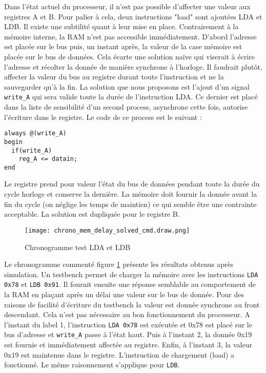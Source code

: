 Dans l'état actuel du processeur, il n'est pas possible d'affecter une valeur aux registres A et B.
Pour palier à cela, deux instructions "load" sont ajoutées LDA et LDB.
Il existe une subtilité quant à leur mise en place. Contrairement à la mémoire interne, la RAM n'est pas accessible immédiatement. 
D'abord l'adresse est placée sur le bus puis, un instant après, la valeur de la case mémoire est placée sur le bus de données.
Cela écarte une solution naïve qui viserait à écrire l'adresse et récolter la donnée de manière synchrone à l'horloge.
Il faudrait plutôt, affecter la valeur du bus au registre durant toute l'instruction et ne la sauvegarder qu'à la fin.
La solution que nous proposons est l'ajout d'un signal \texttt{write\_A} qui sera valide toute la durée de l'instruction LDA.
Ce dernier est placé dans la liste de sensibilité d'un second process, asynchrone cette fois, autorise l'écriture dans le registre. 
Le code de ce process est le suivant :
\begin{lstlisting}
always @(write_A)
begin
  if(write_A)
    reg_A <= datain;
end
\end{lstlisting}
Le registre prend pour valeur l'état du bus de données pendant toute la durée du cycle horloge et conserve la dernière.
La mémoire doit fournir la donnée avant la fin du cycle (on néglige les temps de maintien) ce qui semble être une contrainte acceptable.
La solution est dupliquée pour le registre B.
\begin{figure}[H]
    \centering
    \texttt{[image: chrono\_mem\_delay\_solved\_cmd.draw.png]}
    \caption{Chronogramme test LDA et LDB}
    \label{fig:test_LD}
\end{figure}
Le chronogramme commenté figure \ref{fig:test_LD} présente les résultats obtenus après simulation.
Un testbench permet de charger la mémoire avec les instructions \texttt{LDA 0x78} et \texttt{LDB 0x91}. 
Il fournit ensuite une réponse semblable au comportement de la \gls{RAM} en plaçant après un délai une valeur sur le bus de donnée.
Pour des raisons de facilité d'écriture du testbench la valeur est donnée synchrone au front descendant.
Cela n'est pas nécessaire au bon fonctionnement du processeur.
A l'instant du label 1, l'instruction \texttt{LDA 0x78} est exécutée et 0x78 est placé sur le bus d'adresse et \texttt{write\_A} passe à l'état haut.
Puis à l'instant 2, la donnée 0x19 est fournie et immédiatement affectée au registre.
Enfin, à l'instant 3, la valeur 0x19 est maintenue dans le registre. 
L'instruction de chargement (load) a fonctionné.
Le même raisonnement s'applique pour \texttt{LDB}.



